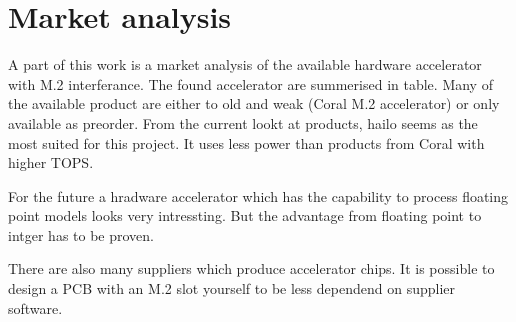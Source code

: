 \chapter{Market analysis}


A part of this work is a market analysis of the available hardware accelerator with M.2 interferance.
The found accelerator are summerised in table.
Many of the available product are either to old and weak (Coral M.2 accelerator) or only available as preorder.
From the current lookt at products, hailo seems as the most suited for this project.
It uses less power than products from Coral with higher TOPS.

For the future a hradware accelerator which has the capability to process floating point models looks very intressting.
But the advantage from floating point to intger has to be proven.

There are also many suppliers which produce accelerator chips.
It is possible to design a PCB with an M.2 slot yourself to be less dependend on supplier software.


